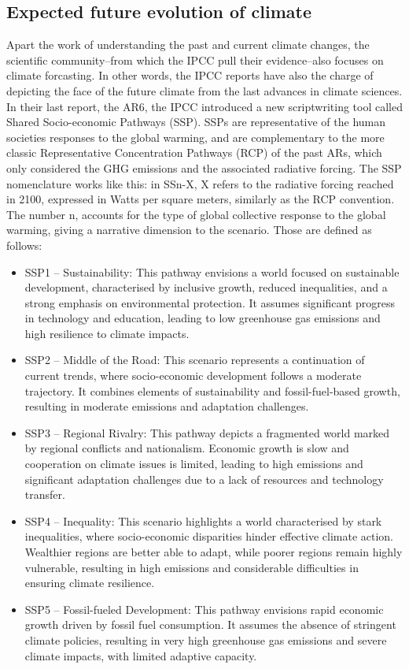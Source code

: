 \subsection{Expected future evolution of climate}
\label{sec:expected_evolution}
Apart the work of understanding the past and current climate changes, the scientific community\---from which the IPCC pull their evidence\---also focuses on climate forcasting. In other words, the IPCC reports have also the charge of depicting the face of the future climate from the last advances in climate sciences.
In their last report, the AR6, the IPCC introduced a new scriptwriting tool called Shared Socio-economic Pathways (SSP). SSPs are representative of the human societies responses to the global warming, and are complementary to the more classic Representative Concentration Pathways (RCP) of the past ARs, which only considered the GHG emissions and the associated radiative forcing. 
The SSP nomenclature works like this: in SSn-X, X refers to the radiative forcing reached in 2100, expressed in Watts per square meters, similarly as the RCP convention.
The number n, accounts for the type of global collective response to the global warming, giving a narrative dimension to the scenario. Those are defined as follows:
\begin{itemize}
    \item{SSP1 – Sustainability:} This pathway envisions a world focused on sustainable development, characterised by inclusive growth, reduced inequalities, and a strong emphasis on environmental protection. It assumes significant progress in technology and education, leading to low greenhouse gas emissions and high resilience to climate impacts.
    \item{SSP2 – Middle of the Road:} This scenario represents a continuation of current trends, where socio-economic development follows a moderate trajectory. It combines elements of sustainability and fossil-fuel-based growth, resulting in moderate emissions and adaptation challenges.
    \item{SSP3 – Regional Rivalry:} This pathway depicts a fragmented world marked by regional conflicts and nationalism. Economic growth is slow and cooperation on climate issues is limited, leading to high emissions and significant adaptation challenges due to a lack of resources and technology transfer.
    \item{SSP4 – Inequality:} This scenario highlights a world characterised by stark inequalities, where socio-economic disparities hinder effective climate action. Wealthier regions are better able to adapt, while poorer regions remain highly vulnerable, resulting in high emissions and considerable difficulties in ensuring climate resilience.
    \item{SSP5 – Fossil-fueled Development:} This pathway envisions rapid economic growth driven by fossil fuel consumption. It assumes the absence of stringent climate policies, resulting in very high greenhouse gas emissions and severe climate impacts, with limited adaptive capacity.
\end{itemize}

